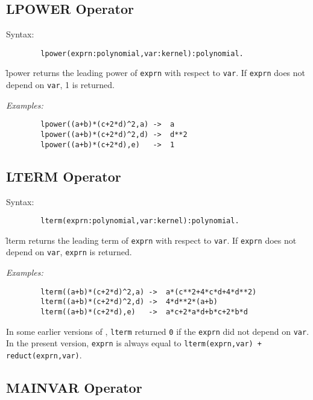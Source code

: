 \subsection{LPOWER Operator}
\hypertarget{operator:LPOWER}{}

Syntax:
\begin{verbatim}
        lpower(exprn:polynomial,var:kernel):polynomial.
\end{verbatim}
\f{lpower} returns the leading power of \texttt{exprn} with respect to \texttt{var}.
If \texttt{exprn} does not depend on \texttt{var}, 1 is returned.

\textit{Examples:}
\begin{verbatim}
        lpower((a+b)*(c+2*d)^2,a) ->  a
        lpower((a+b)*(c+2*d)^2,d) ->  d**2
        lpower((a+b)*(c+2*d),e)   ->  1
\end{verbatim}

\subsection{LTERM Operator}
\hypertarget{operator:LTERM}{}

\begin{samepage}
Syntax:
\begin{verbatim}
        lterm(exprn:polynomial,var:kernel):polynomial.
\end{verbatim}
\f{lterm} returns the leading term of \texttt{exprn} with respect to \texttt{var}.
If \texttt{exprn} does not depend on \texttt{var}, \texttt{exprn} is returned.
\end{samepage}

\textit{Examples:}
\begin{verbatim}
        lterm((a+b)*(c+2*d)^2,a) ->  a*(c**2+4*c*d+4*d**2)
        lterm((a+b)*(c+2*d)^2,d) ->  4*d**2*(a+b)
        lterm((a+b)*(c+2*d),e)   ->  a*c+2*a*d+b*c+2*b*d
\end{verbatim}

{\COMPATNOTE} In some earlier versions of \REDUCE, \texttt{lterm} returned
\texttt{0} if the \texttt{exprn} did not depend on \texttt{var}.  In the present
version, \texttt{exprn} is always equal to
\texttt{lterm(exprn,var) + reduct(exprn,var)}.

\subsection{MAINVAR Operator}
\hypertarget{operator:MAINVAR}{}

